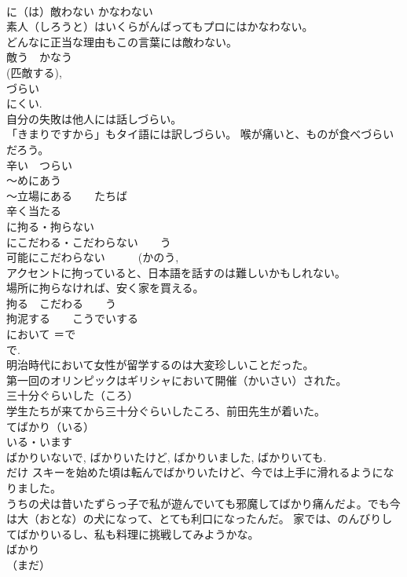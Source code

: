 \documentclass[8pt]{extreport}
\begin{document}
\begin{CJK}{UTF8}{min}
\\	に（は）敵わない	かなわない 
\\	素人（しろうと）はいくらがんばってもプロにはかなわない。 
\\	どんなに正当な理由もこの言葉には敵わない。 
\\	敵う　かなう 
\\	(匹敵する), 
\\	づらい	
\\	にくい. 
\\	自分の失敗は他人には話しづらい。 
\\	「きまりですから」もタイ語には訳しづらい。 喉が痛いと、ものが食べづらいだろう。 
\\	辛い　つらい 
\\	～めにあう 
\\	～立場にある　　たちば 
\\	辛く当たる 
\\	に拘る・拘らない	
\\	にこだわる・こだわらない　　う
\\	可能にこだわらない　　　(かのう, 
\\	アクセントに拘っていると、日本語を話すのは難しいかもしれない。 
\\	場所に拘らなければ、安く家を買える。 
\\	拘る　こだわる　　う
\\	拘泥する　　こうでいする 
\\	において	＝で 
\\	で. 
\\	明治時代において女性が留学するのは大変珍しいことだった。 
\\	第一回のオリンピックはギリシャにおいて開催（かいさい）された。 
\\	三十分ぐらいした（ころ） 
\\	学生たちが来てから三十分ぐらいしたころ、前田先生が着いた。
\\	てばかり（いる）	
\\	いる・います 
\\	ばかりいないで, ばかりいたけど, ばかりいました, ばかりいても. 
\\	だけ スキーを始めた頃は転んでばかりいたけど、今では上手に滑れるようになりました。 
\\	うちの犬は昔いたずらっ子で私が遊んでいても邪魔してばかり痛んだよ。でも今は大（おとな）の犬になって、とても利口になったんだ。 家では、のんびりしてばかりいるし、私も料理に挑戦してみようかな。 
\\	ばかり 
\\	（まだ）

\end{CJK}
\end{document}
